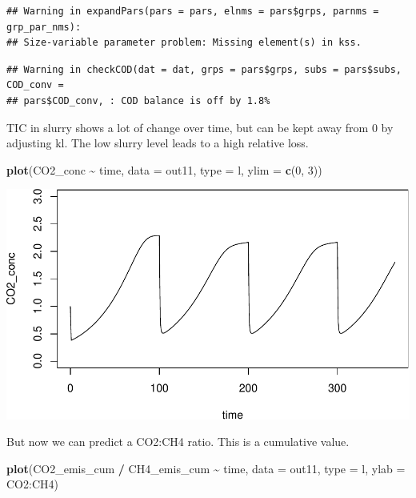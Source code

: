 \documentclass[
]{article}
\newenvironment{Shaded}{\begin{snugshade}}{\end{snugshade}}
\newcommand{\AttributeTok}[1]{\textcolor[rgb]{0.13,0.29,0.53}{#1}}
\newcommand{\DecValTok}[1]{\textcolor[rgb]{0.00,0.00,0.81}{#1}}
\newcommand{\FunctionTok}[1]{\textcolor[rgb]{0.13,0.29,0.53}{\textbf{#1}}}
\newcommand{\NormalTok}[1]{#1}
\newcommand{\SpecialCharTok}[1]{\textcolor[rgb]{0.81,0.36,0.00}{\textbf{#1}}}
\newcommand{\StringTok}[1]{\textcolor[rgb]{0.31,0.60,0.02}{#1}}
\begin{document}
\begin{verbatim}
## Warning in expandPars(pars = pars, elnms = pars$grps, parnms = grp_par_nms):
## Size-variable parameter problem: Missing element(s) in kss.
\end{verbatim}

\begin{verbatim}
## Warning in checkCOD(dat = dat, grps = pars$grps, subs = pars$subs, COD_conv =
## pars$COD_conv, : COD balance is off by 1.8%
\end{verbatim}

TIC in slurry shows a lot of change over time, but can be kept away from
0 by adjusting kl. The low slurry level leads to a high relative loss.

\begin{Shaded}
\begin{Highlighting}[]
\FunctionTok{plot}\NormalTok{(CO2\_conc }\SpecialCharTok{\textasciitilde{}}\NormalTok{ time, }\AttributeTok{data =}\NormalTok{ out11, }\AttributeTok{type =} \StringTok{\textquotesingle{}l\textquotesingle{}}\NormalTok{, }\AttributeTok{ylim =} \FunctionTok{c}\NormalTok{(}\DecValTok{0}\NormalTok{, }\DecValTok{3}\NormalTok{))}
\end{Highlighting}
\end{Shaded}

\includegraphics{simple_demo_files/figure-latex/unnamed-chunk-88-1.pdf}

But now we can predict a CO2:CH4 ratio. This is a cumulative value.

\begin{Shaded}
\begin{Highlighting}[]
\FunctionTok{plot}\NormalTok{(CO2\_emis\_cum }\SpecialCharTok{/}\NormalTok{ CH4\_emis\_cum }\SpecialCharTok{\textasciitilde{}}\NormalTok{ time, }\AttributeTok{data =}\NormalTok{ out11, }\AttributeTok{type =} \StringTok{\textquotesingle{}l\textquotesingle{}}\NormalTok{, }\AttributeTok{ylab =} \StringTok{\textquotesingle{}CO2:CH4\textquotesingle{}}\NormalTok{)}
\end{Highlighting}
\end{Shaded}
\end{document}
